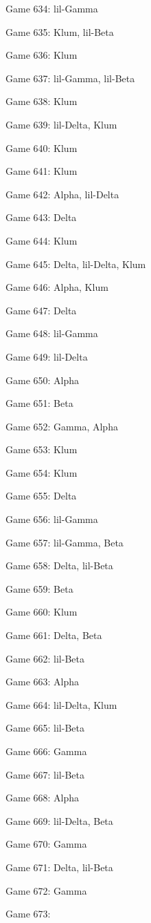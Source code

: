 \documentclass{article}
\begin{document}
\begin{multicols}{3}
\begin{compactitem}
\item Game 634:
lil-Gamma
\item Game 635:
Klum, lil-Beta
\item Game 636:
Klum
\item Game 637:
lil-Gamma, lil-Beta
\item Game 638:
Klum
\item Game 639:
lil-Delta, Klum
\item Game 640:
Klum
\item Game 641:
Klum
\item Game 642:
Alpha, lil-Delta
\item Game 643:
Delta
\item Game 644:
Klum
\item Game 645:
Delta, lil-Delta, Klum
\item Game 646:
Alpha, Klum
\item Game 647:
Delta
\item Game 648:
lil-Gamma
\item Game 649:
lil-Delta
\item Game 650:
Alpha
\item Game 651:
Beta
\item Game 652:
Gamma, Alpha
\item Game 653:
Klum
\item Game 654:
Klum
\item Game 655:
Delta
\item Game 656:
lil-Gamma
\item Game 657:
lil-Gamma, Beta
\item Game 658:
Delta, lil-Beta
\item Game 659:
Beta
\item Game 660:
Klum
\item Game 661:
Delta, Beta
\item Game 662:
lil-Beta
\item Game 663:
Alpha
\item Game 664:
lil-Delta, Klum
\item Game 665:
lil-Beta
\item Game 666:
Gamma
\item Game 667:
lil-Beta
\item Game 668:
Alpha
\item Game 669:
lil-Delta, Beta
\item Game 670:
Gamma
\item Game 671:
Delta, lil-Beta
\item Game 672:
Gamma
\item Game 673:

\end{compactitem}
\end{multicols}
\end{document}
